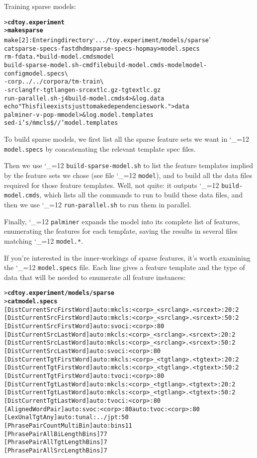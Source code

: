 \documentclass[11pt,letterpaper]{article}
\newcommand{\bs}{\textbackslash{}}
\def\code{\begingroup\catcode`\_=12 \codex}
\newcommand{\codex}[1]{\texttt{#1}\endgroup}
\begin{document}
Training sparse models:
\begin{small}
\begin{alltt}
   > \textbf{cd toy.experiment}
   > \textbf{make sparse}
   make[2]: Entering directory `.../toy.experiment/models/sparse'
   cat sparse-specs-fastdhdm sparse-specs-hopmay > model.specs
   rm -f data.* build-model.cmds model
   build-sparse-model.sh -cmdfile build-model.cmds -model model -config model.specs \bs
      -corp ../../corpora/tm-train \bs
      -srclang fr -tgtlang en -srcext lc.gz -tgtext lc.gz
   run-parallel.sh -j 4 build-model.cmds 4 >& log.data
   echo "This file exists just to make dependencies work." > data
   palminer -v -pop -m model >& log.model.templates
   sed -i 's/\.mmcls\$//' model.templates
\end{alltt}
\end{small}

To build sparse models, we first list all the sparse feature sets we want in
\code{model.specs} by concatenating the relevant template spec files.

Then we use \code{build-sparse-model.sh} to list the feature
templates implied by the feature sets we chose (see file \code{model}), and to build all
the data files required for those feature templates. Well, not quite: it
outputs \code{build-model.cmds}, which lists all the commands to run to build
these data files, and then we use \code{run-parallel.sh} to run them in
parallel.

Finally, \code{palminer} expands the model into its complete list
of features, enumerating the features for each template, saving the
results in several files matching \code{model.*}.


If you're interested in the inner-workings of sparse features, it's worth
examining the \code{model.specs} file. Each line gives a feature template and
the type of data that will be needed to enumerate all feature instances:

\begin{small}
\begin{alltt}
   > \textbf{cd toy.experiment/models/sparse}
   > \textbf{cat model.specs}
   [DistCurrentSrcFirstWord] auto:mkcls:<corp>_<srclang>.<srcext>:20:2
   [DistCurrentSrcFirstWord] auto:mkcls:<corp>_<srclang>.<srcext>:50:2
   [DistCurrentSrcFirstWord] auto:svoci:<corp>:80
   [DistCurrentSrcLastWord]  auto:mkcls:<corp>_<srclang>.<srcext>:20:2
   [DistCurrentSrcLastWord]  auto:mkcls:<corp>_<srclang>.<srcext>:50:2
   [DistCurrentSrcLastWord]  auto:svoci:<corp>:80
   [DistCurrentTgtFirstWord] auto:mkcls:<corp>_<tgtlang>.<tgtext>:20:2
   [DistCurrentTgtFirstWord] auto:mkcls:<corp>_<tgtlang>.<tgtext>:50:2
   [DistCurrentTgtFirstWord] auto:tvoci:<corp>:80
   [DistCurrentTgtLastWord]  auto:mkcls:<corp>_<tgtlang>.<tgtext>:20:2
   [DistCurrentTgtLastWord]  auto:mkcls:<corp>_<tgtlang>.<tgtext>:50:2
   [DistCurrentTgtLastWord]  auto:tvoci:<corp>:80
   [AlignedWordPair]            auto:svoc:<corp>:80 auto:tvoc:<corp>:80
   [LexUnalTgtAny]              auto:tunal:../jpt:50
   [PhrasePairCountMultiBin]    auto:bins11
   [PhrasePairAllBiLengthBins]  7 7
   [PhrasePairAllTgtLengthBins] 7
   [PhrasePairAllSrcLengthBins] 7
\end{alltt}
\end{small}
\end{document}
